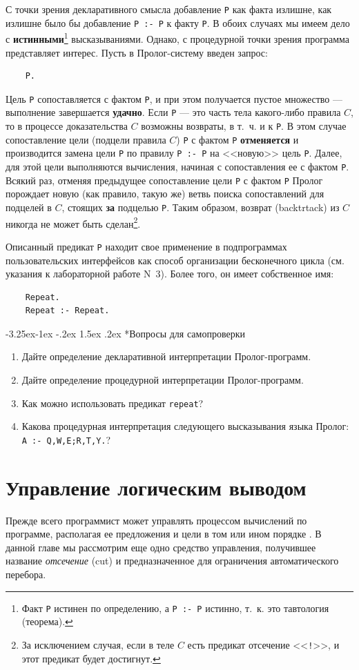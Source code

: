 \documentclass[12pt, openany, twoside]{book} %
\makeatletter
\renewcommand\subsubsection{\@startsection{subsubsection}{3}{\z@}%
                                     {-3.25ex\@plus -1ex \@minus -.2ex}%
                                     {1.5ex \@plus .2ex}%
                                     {\normalfont\normalsize\bfseries}}
\newenvironment{questions}{\subsubsection*{Вопросы для самопроверки}\begin{enumerate}}{\end{enumerate}}
\makeatother
\begin{document}
\noindent С точки зрения декларативного смысла добавление {\tt P} как факта излишне, как излишне было бы добавление {\tt P~:-~P} к факту {\tt P}. В обоих случаях мы имеем дело с {\bf истинными}\footnote{Факт {\tt P} истинен по определению, а {\tt P~:-~P} истинно, т.~к. это тавтология (теорема).} высказываниями. Однако, с процедурной точки зрения программа представляет интерес. Пусть в Пролог-систему введен запрос:
{\tt\begin{verbatim}
    P.
\end{verbatim}}
\noindent Цель {\tt P} сопоставляется с фактом {\tt P}, и при этом получается пустое множество --- выполнение завершается {\bf удачно}. Если {\tt P} --- это часть тела какого-либо правила $C$, то в процессе доказательства $C$ возможны возвраты, в т.~ч. и к {\tt P}. В этом случае сопоставление цели (подцели правила $C$) {\tt P} с фактом {\tt P} {\bf отменяется} и производится замена цели {\tt P} по правилу {\tt P~:-~P} на <<новую>> цель {\tt P}. Далее, для этой цели выполняются вычисления, начиная с сопоставления ее с фактом {\tt P}. Всякий раз, отменяя предыдущее сопоставление цели {\tt P} с фактом {\tt P} Пролог порождает новую (как правило, такую же) ветвь поиска сопоставлений для подцелей в $C$, стоящих {\bf за} подцелью {\tt P}. Таким образом, возврат (backtrtack) из $C$ никогда не может быть сделан\footnote{За исключением случая, если в теле $C$ есть предикат отсечение <<{\tt !}>>, и этот предикат будет достигнут.}.

Описанный предикат {\tt P} находит свое применение в подпрограммах пользовательских интерфейсов как способ организации бесконечного цикла (см. указания к лабораторной работе N~3). Более того, он имеет собственное имя:
{\tt\begin{verbatim}
    Repeat.
    Repeat :- Repeat.
\end{verbatim}}

\begin{questions}
  \item{} Дайте определение декларативной интерпретации Пролог-про\-грамм.
  \item{} Дайте определение процедурной интерпретации Пролог-про\-грамм.
  \item{} Как можно использовать предикат \texttt{repeat}?
  \item{} Какова процедурная интерпретация следующего высказывания языка Пролог: \texttt{A :- Q,W,E;R,T,Y.}?
\end{questions}


\chapter{Управление логическим выводом}
Прежде всего программист может управлять процессом вычислений по программе, располагая ее предложения и цели в том или ином порядке \cite{Bratko}. В данной главе мы рассмотрим еще одно средство управления, получившее название {\em отсечение} (cut) и предназначенное для ограничения автоматического перебора.
\end{document}
